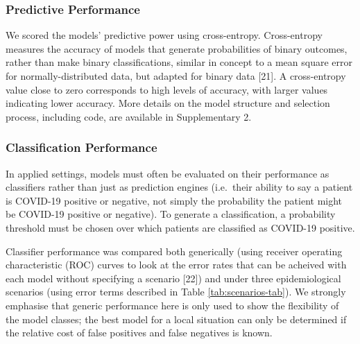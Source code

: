 \documentclass[]{elsarticle} %
\begin{document}
\hypertarget{predictive-performance}{%
\subsubsection{Predictive Performance}\label{predictive-performance}}

We scored the models' predictive power using cross-entropy.
Cross-entropy measures the accuracy of models that generate probabilities of binary outcomes, rather than make binary classifications, similar in concept to a mean square error for normally-distributed data, but adapted for binary data {[}21{]}.
A cross-entropy value close to zero corresponds to high levels of accuracy, with larger values indicating lower accuracy.
More details on the model structure and selection process, including code, are available in Supplementary 2.

\hypertarget{classification-performance}{%
\subsubsection{Classification Performance}\label{classification-performance}}

In applied settings, models must often be evaluated on their performance as classifiers rather than just as prediction engines (i.e.~their ability to say a patient is COVID-19 positive or negative, not simply the probability the patient might be COVID-19 positive or negative).
To generate a classification, a probability threshold must be chosen over which patients are classified as COVID-19 positive.

Classifier performance was compared both generically (using receiver operating characteristic (ROC) curves to look at the error rates that can be acheived with each model without specifying a scenario {[}22{]}) and under three epidemiological scenarios (using error terms described in Table \ref{tab:scenarios-tab}).
We strongly emphasise that generic performance here is only used to show the flexibility of the model classes; the best model for a local situation can only be determined if the relative cost of false positives and false negatives is known.
\end{document}
